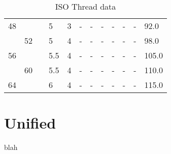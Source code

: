 \begin{table}[h!]
\begin{longtable}{lll|ll|llllll|l}
    48  &    &    &5    &3          &-   &-      &-      &-      &- &-    &92.0  \\
        &52  &    &5    &4          &-   &-      &-      &-      &- &-    &98.0  \\
    56  &    &    &5.5  &4          &-   &-      &-      &-      &- &-    &105.0 \\
        &60  &    &5.5  &4          &-   &-      &-      &-      &- &-    &110.0 \\
    64  &    &    &6    &4          &-   &-      &-      &-      &- &-    &115.0 \\
\end{longtable}
\caption{ISO Thread data}
\end{table}







\clearpage
\section{Unified}
blah
\\ \\ \\ \\ \\ \\ \\ \\ \\ \\ \\ \\ \\ \\ \\ \\ \\ \\               

